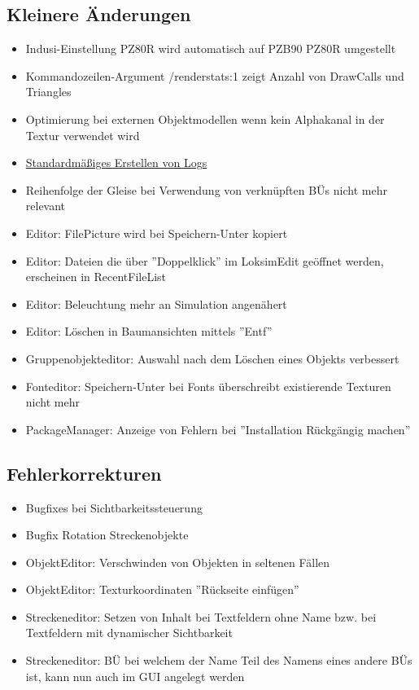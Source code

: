\subsection{Kleinere Änderungen}
\begin{itemize}
\item Indusi-Einstellung PZ80R wird automatisch auf PZB90 PZ80R umgestellt
\item Kommandozeilen-Argument /renderstats:1 zeigt Anzahl von DrawCalls und Triangles
\item Optimierung bei externen Objektmodellen wenn kein Alphakanal in der Textur verwendet wird
\item \hyperref[sec:editor-logging]{Standardmäßiges Erstellen von Logs}
\item Reihenfolge der Gleise bei Verwendung von verknüpften BÜs nicht mehr relevant
\item Editor: FilePicture wird bei Speichern-Unter kopiert
\item Editor: Dateien die über ''Doppelklick'' im LoksimEdit geöffnet werden, erscheinen in RecentFileList
\item Editor: Beleuchtung mehr an Simulation angenähert
\item Editor: Löschen in Baumansichten mittels ''Entf''
\item Gruppenobjekteditor: Auswahl nach dem Löschen eines Objekts verbessert
\item Fonteditor: Speichern-Unter bei Fonts überschreibt existierende Texturen nicht mehr
\item PackageManager: Anzeige von Fehlern bei ''Installation Rückgängig machen''
\end{itemize}


\subsection{Fehlerkorrekturen}
\begin{itemize}
\item Bugfixes bei Sichtbarkeitssteuerung
\item Bugfix Rotation Streckenobjekte

\item ObjektEditor: Verschwinden von Objekten in seltenen Fällen
\item ObjektEditor: Texturkoordinaten ''Rückseite einfügen''

\item Streckeneditor: Setzen von Inhalt bei Textfeldern ohne Name bzw. bei Textfeldern mit dynamischer Sichtbarkeit
\item Streckeneditor: BÜ bei welchem der Name Teil des Namens eines andere BÜs ist, kann nun auch im GUI angelegt werden
\end{itemize}

